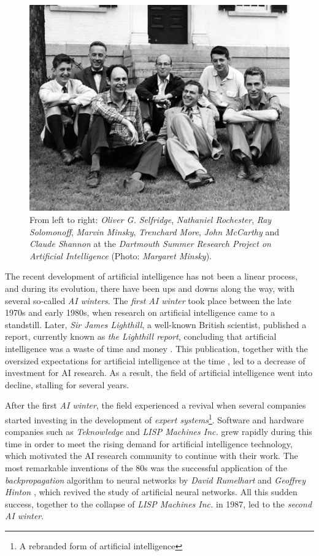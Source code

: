 \begin{figure}[h!]
	\centering
	\includegraphics[width=.6\textwidth]{introduction/images/dartmouth}
	\caption[\textit{Dartmouth Summer Research Project on Artificial Intelligence}]{From left to right: \textit{Oliver G. Selfridge}, \textit{Nathaniel Rochester}, \textit{Ray Solomonoff}, \textit{Marvin Minsky}, \textit{Trenchard More}, \textit{John McCarthy} and \textit{Claude Shannon} at the \textit{Dartmouth Summer Research Project on Artificial Intelligence} (Photo: \textit{Margaret Minsky}).}
	\label{fig:dartmouth_photo}
\end{figure}

The recent development of artificial intelligence has not been a linear process, and during its evolution, there have been ups and downs along the way, with several so-called \textit{AI winters}. The \textit{first AI winter} took place between the late 1970s and early 1980s, when research on artificial intelligence came to a standstill. Later, \textit{Sir James Lighthill}, a well-known British scientist, published a report, currently known as \textit{the Lighthill report}, concluding that artificial intelligence was a waste of time and money \autocite{lighthillReport}. This publication, together with the oversized expectations for artificial intelligence at the time \autocite{russellNorvig}, led to a decrease of investment for AI research. As a result, the field of artificial intelligence went into decline, stalling for several years.

After the first \textit{AI winter}, the field experienced a revival when several companies started investing in the development of \textit{expert systems}\footnote{A rebranded form of artificial intelligence}. Software and hardware companies such as \textit{Teknowledge} and \textit{LISP Machines Inc.} grew rapidly during this time in order to meet the rising demand for artificial intelligence technology, which motivated the AI research community to continue with their work. The most remarkable inventions of the 80s was the successful application of the \textit{backpropagation} algorithm to neural networks by \textit{David Rumelhart} and \textit{Geoffrey Hinton} \autocite{hinton1986}, which revived the study of artificial neural networks. All this sudden success, together to the collapse of \textit{LISP Machines Inc.} in 1987, led to the \textit{second AI winter}.

